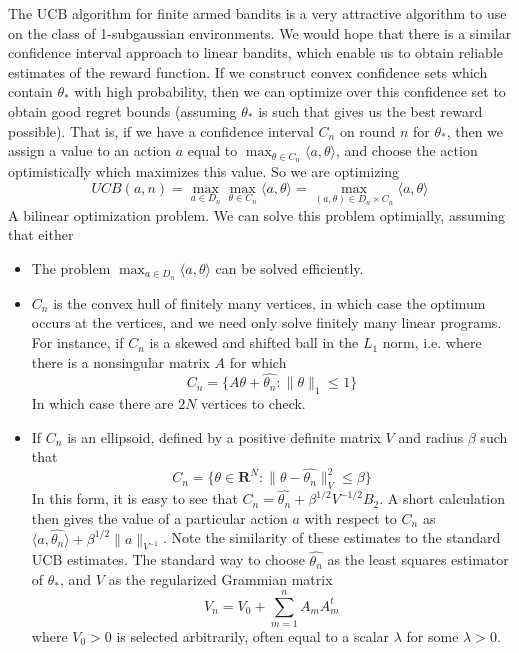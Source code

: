 The UCB algorithm for finite armed bandits is a very attractive algorithm to use on the class of 1-subgaussian environments. We would hope that there is a similar confidence interval approach to linear bandits, which enable us to obtain reliable estimates of the reward function. If we construct convex confidence sets which contain $\theta_*$ with high probability, then we can optimize over this confidence set to obtain good regret bounds (assuming $\theta_*$ is such that gives us the best reward possible). That is, if we have a confidence interval $C_n$ on round $n$ for $\theta_*$, then we assign a value to an action $a$ equal to $\max_{\theta \in C_n} \langle a, \theta \rangle$, and choose the action optimistically which maximizes this value. So we are optimizing
%
\[ UCB(a,n) = \max_{a \in D_n} \max_{\theta \in C_n} \langle a, \theta \rangle = \max_{(a, \theta) \in D_n \times C_n} \langle a, \theta \rangle \]
%
A bilinear optimization problem. We can solve this problem optimially, assuming that either
%
\begin{itemize}
    \item The problem $\max_{a \in D_n} \langle a, \theta \rangle$ can be solved efficiently.
    \item $C_n$ is the convex hull of finitely many vertices, in which case the optimum occurs at the vertices, and we need only solve finitely many linear programs. For instance, if $C_n$ is a skewed and shifted ball in the $L_1$ norm, i.e. where there is a nonsingular matrix $A$ for which
    \[ C_n = \{ A\theta + \hat{\theta_n} : \| \theta \|_1 \leq 1 \} \]
    In which case there are $2N$ vertices to check.
    \item If $C_n$ is an ellipsoid, defined by a positive definite matrix $V$ and radius $\beta$ such that
    \[ C_n = \{ \theta \in \mathbf{R}^N : \| \theta - \hat{\theta_n} \|^2_V \leq \beta \} \]
    In this form, it is easy to see that $C_n = \widehat{\theta_n} + \beta^{1/2} V^{-1/2} B_2$. A short calculation then gives the value of a particular action $a$ with respect to $C_n$ as $\langle a, \widehat{\theta_n} \rangle + \beta^{1/2} \| a \|_{V^{-1}}$. Note the similarity of these estimates to the standard UCB estimates. The standard way to choose $\widehat{\theta_n}$ as the least squares estimator of $\theta_*$, and $V$ as the regularized Grammian matrix
    \[ V_n = V_0 + \sum_{m = 1}^n A_m A_m^t \]
    where $V_0 > 0$ is selected arbitrarily, often equal to a scalar $\lambda$ for some $\lambda > 0$.
\end{itemize}

